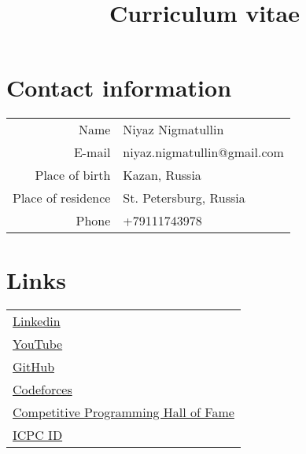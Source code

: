 \documentclass[11pt,a4paper,oneside]{article}
\begin{document}
\title{ \vspace{-2cm} Curriculum vitae \vspace{-1cm} }
\date{}        

\maketitle

\begin{multicols}{2}

\section{Contact information}
\begin{center}
\begin{tabular}{r|l}
    Name&Niyaz Nigmatullin \\
    E-mail&niyaz.nigmatullin@gmail.com \\
    Place of birth&Kazan, Russia \\
    Place of residence & St. Petersburg, Russia \\
    Phone & +79111743978 \\
\end{tabular}
\end{center}

\section{Links}

\begin{center}
    \begin{tabular}{l}
        \href{https://www.linkedin.com/in/niyaz-nigmatullin-6506561b6/}{Linkedin} \\
        \href{https://www.youtube.com/c/NiyazNigmatullin}{YouTube} \\
        \href{https://github.com/niyaznigmatullin/}{GitHub} \\
        \href{https://codeforces.com/profile/niyaznigmatul}{Codeforces} \\
        \href{https://cphof.org/profile/topcoder:niyaznigmatul}{Competitive Programming Hall of Fame} \\
        \href{https://icpc.global/ICPCID/ZADFZYP7ZPVE}{ICPC ID} \\
    \end{tabular}
\end{center}

\end{multicols}
\end{document}
